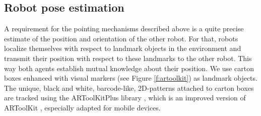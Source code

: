 \subsection{Robot pose estimation}
\label{s:extimating-robot-position}

A requirement for the pointing mechanisms described above is a quite
precise estimate of the position and orientation of the other
robot. For that, robots localize themselves with respect to landmark
objects in the environment and transmit their position with respect to
these landmarks to the other robot. This way both agents establish
mutual knowledge about their position. We use carton boxes enhanced
with visual markers (see Figure \ref{f:artoolkit}) as landmark
objects.  The unique, black and white, barcode-like, 2D-patterns
attached to carton boxes are tracked using the ARToolKitPlus library
\citep{wagner07artoolkitplus}, which is an improved version of
ARToolKit \citep{kato99marker,kato00virtual}, especially adapted for
mobile devices.


